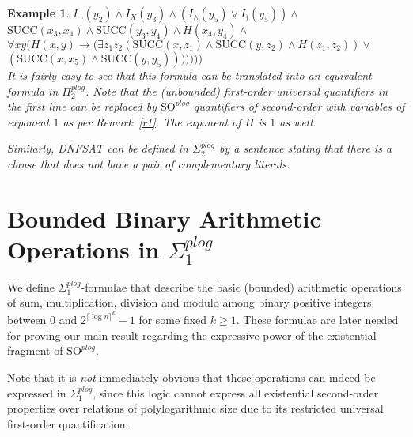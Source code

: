 \documentclass{article}
\newtheorem{example}{Example}
\begin{document}
\begin{example}
\hspace*{2.5cm} $I_\neg(y_2) \wedge I_X(y_3) \wedge (I_\wedge(y_5) \vee I_)(y_5)) \wedge $ \\[0.1cm]
\hspace*{2.5cm} $\mathrm{SUCC}(x_3, x_4) \wedge \mathrm{SUCC}(y_3, y_4) \wedge H(x_4, y_4) \wedge $\\[0.1cm]
\hspace*{2.5cm} $\forall x y \big(H(x, y) \rightarrow \big(\exists z_1 z_2 (\mathrm{SUCC}(x, z_1) \wedge \mathrm{SUCC}(y, z_2) \wedge H(z_1, z_2) ) \vee$\\[0.1cm] 
\hspace*{5.1cm} $(\mathrm{SUCC}(x, x_5) \wedge \mathrm{SUCC}(y, y_5))\big)\big)\Big)\bigg)\Bigg)$\\[0.1cm]
It is fairly easy to see that this formula can be translated into an equivalent formula in $\Pi^{\mathit{plog}}_2$. Note that the (unbounded) first-order universal quantifiers in the first line can be replaced by $\mathrm{SO}^{\mathit{plog}}$ quantifiers of second-order with variables of exponent $1$ as per Remark~\ref{r1}. The exponent of $H$ is $1$ as well. 

Similarly, DNFSAT can be defined in $\Sigma^{\mathit{plog}}_2$ by a sentence stating that there is a clause that does not have a pair of complementary literals.
\end{example}


\section{Bounded Binary Arithmetic Operations in \texorpdfstring{$\Sigma^{\mathit{plog}}_1$}{TEXT}}\label{sec:arithexampls}\label{sec:examples}

We define $\Sigma^{\mathit{plog}}_1$-formulae that describe the basic (bounded) arithmetic operations of sum, multiplication, division and modulo among binary positive integers between $0$ and $2^{\lceil\log n \rceil^k}-1$ for some fixed $k \geq 1$. These formulae are later needed for proving our main result regarding the expressive power of the existential fragment of $\mathrm{SO}^{\mathit{plog}}$.  

Note that it is \emph{not} immediately obvious that these operations can indeed be expressed in $\Sigma^{\mathit{plog}}_1$, since this logic cannot express all existential second-order properties over relations of polylogarithmic size due to its restricted universal first-order quantification.
\end{document}
